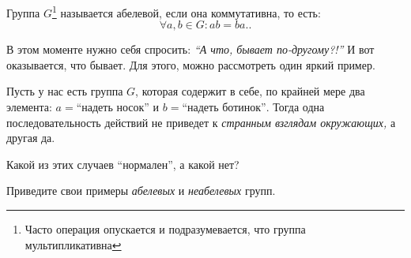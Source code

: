 \begin{definition}
    Группа $G$\footnote{Часто операция опускается и подразумевается, что группа мультипликативна} 
    называется абелевой, если она коммутативна, то есть: \[
        \forall a, b \in G: ab = ba.
    .\] 
\end{definition}

В этом моменте нужно себя спросить: \emph{``А что, бывает по-другому?!''} И вот оказывается, что бывает.
Для этого, можно рассмотреть один яркий пример. 
\begin{example}
    Пусть у нас есть группа $G$, которая содержит в себе, по крайней мере два элемента: 
    $a = \text{``надеть носок''}$ и $b = \text{``надеть ботинок''}$.
    Тогда одна последовательность действий не приведет к \emph{странным взглядам окружающих,} а другая да.
\end{example}

\begin{practice}
   Какой из этих случаев ``нормален'', а какой нет? 
\end{practice}
\begin{practice}
    Приведите свои примеры \emph{абелевых} и \emph{неабелевых} групп. 
\end{practice}
